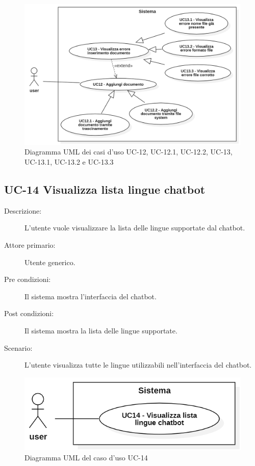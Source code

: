 \begin{figure}[H]
    \centering
    \includegraphics[width=\linewidth]{UC12-13.PNG}
    \caption{Diagramma UML dei casi d'uso UC-12, UC-12.1, UC-12.2, UC-13, UC-13.1, UC-13.2 e UC-13.3}
    \label{fig:UC12-13}
\end{figure}

\subsection{UC-14 Visualizza lista lingue chatbot}
\begin{description}
    \item[Descrizione:] L'utente vuole visualizzare la lista delle lingue supportate dal chatbot.
    \item[Attore primario:] Utente generico.
    \item[Pre condizioni:] Il sistema mostra l'interfaccia del chatbot.
    \item[Post condizioni:] Il sistema mostra la lista delle lingue supportate.
    \item[Scenario:] L'utente visualizza tutte le lingue utilizzabili nell'interfaccia del chatbot.
\end{description}

\begin{figure}[H]
    \centering
    \includegraphics[width=0.8\linewidth]{UC14.png}
    \caption{Diagramma UML del caso d'uso UC-14}
    \label{fig:UC14}
\end{figure}

